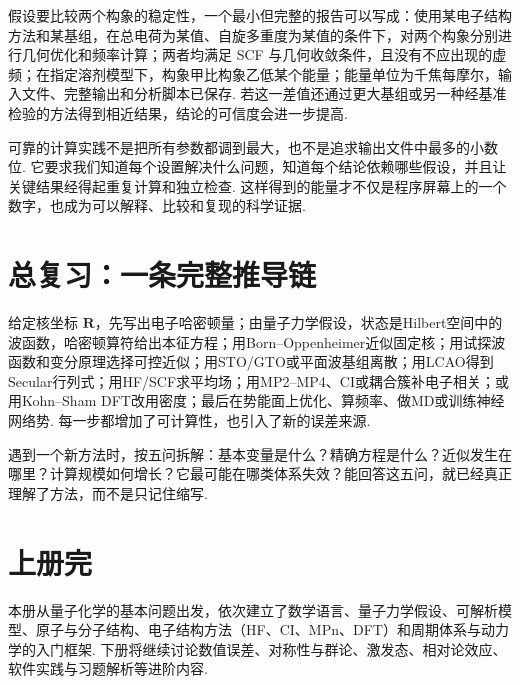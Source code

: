 \documentclass[UTF8,11pt,a4paper,openany]{ctexbook}
\begin{document}
\begin{examplebox}
假设要比较两个构象的稳定性，一个最小但完整的报告可以写成：使用某电子结构方法和某基组，在总电荷为某值、自旋多重度为某值的条件下，对两个构象分别进行几何优化和频率计算；两者均满足 SCF 与几何收敛条件，且没有不应出现的虚频；在指定溶剂模型下，构象甲比构象乙低某个能量；能量单位为千焦每摩尔，输入文件、完整输出和分析脚本已保存. 若这一差值还通过更大基组或另一种经基准检验的方法得到相近结果，结论的可信度会进一步提高. 
\end{examplebox}

可靠的计算实践不是把所有参数都调到最大，也不是追求输出文件中最多的小数位. 它要求我们知道每个设置解决什么问题，知道每个结论依赖哪些假设，并且让关键结果经得起重复计算和独立检查. 这样得到的能量才不仅是程序屏幕上的一个数字，也成为可以解释、比较和复现的科学证据. 
\chapter{总复习：一条完整推导链}
给定核坐标 $\mathbf R$，先写出电子哈密顿量；由量子力学假设，状态是Hilbert空间中的波函数，哈密顿算符给出本征方程；用Born--Oppenheimer近似固定核；用试探波函数和变分原理选择可控近似；用STO/GTO或平面波基组离散；用LCAO得到Secular行列式；用HF/SCF求平均场；用MP2--MP4、CI或耦合簇补电子相关；或用Kohn--Sham DFT改用密度；最后在势能面上优化、算频率、做MD或训练神经网络势. 每一步都增加了可计算性，也引入了新的误差来源. 
\begin{examplebox}遇到一个新方法时，按五问拆解：基本变量是什么？精确方程是什么？近似发生在哪里？计算规模如何增长？它最可能在哪类体系失效？能回答这五问，就已经真正理解了方法，而不是只记住缩写. \end{examplebox}

\chapter*{上册完}

本册从量子化学的基本问题出发，依次建立了数学语言、量子力学假设、可解析模型、原子与分子结构、电子结构方法（HF、CI、MPn、DFT）和周期体系与动力学的入门框架. 下册将继续讨论数值误差、对称性与群论、激发态、相对论效应、软件实践与习题解析等进阶内容. 
\end{document}
